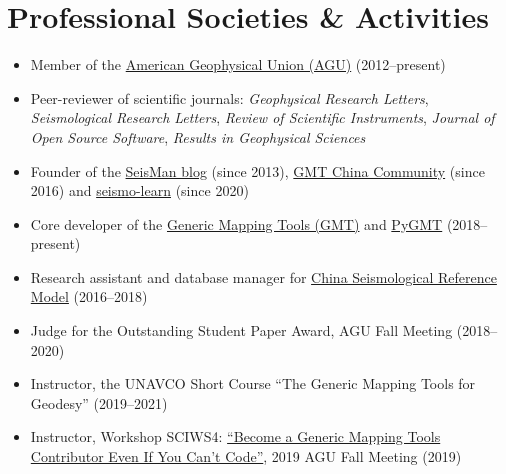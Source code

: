\section*{Professional Societies \& Activities}

\begin{itemize}
\item Member of the \href{https://sites.agu.org/}{American Geophysical Union (AGU)} (2012--present)
\item Peer-reviewer of scientific journals:
      \textit{Geophysical Research Letters},
      \textit{Seismological Research Letters},
      \textit{Review of Scientific Instruments},
      \textit{Journal of Open Source Software},
      \textit{Results in Geophysical Sciences}
\item Founder of the \href{https://blog.seisman.info}{SeisMan blog} (since 2013),
      \href{http://gmt-china.org/}{GMT China Community} (since 2016)
      and \href{https://seismo-learn.org/}{seismo-learn} (since 2020)
\item Core developer of the \href{https://github.com/GenericMappingTools/gmt}{Generic Mapping Tools (GMT)} and \href{https://github.com/GenericMappingTools/pygmt}{PyGMT} (2018--present)
\item Research assistant and database manager for \href{http://chinageorefmodel.org/}{China Seismological Reference Model} (2016--2018)
\item Judge for the Outstanding Student Paper Award, AGU Fall Meeting (2018--2020)
\item Instructor, the UNAVCO Short Course ``The Generic Mapping Tools for Geodesy'' (2019--2021)
\item Instructor, Workshop SCIWS4: \href{https://www.agu.org/Events/SCIWS4-Generic-Mapping-Tools}{``Become a Generic Mapping Tools Contributor Even If You Can't Code''}, 2019 AGU Fall Meeting (2019)
\end{itemize}
